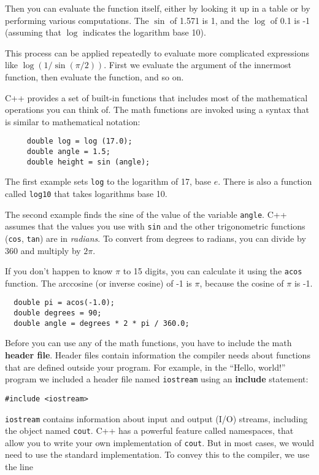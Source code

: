 Then you can evaluate the function itself, either by looking it up in
a table or by performing various computations.  The $\sin$ of 1.571 is
1, and the $\log$ of 0.1 is -1 (assuming that $\log$ indicates the
logarithm base 10).

This process can be applied repeatedly to evaluate more complicated
expressions like $\log(1/\sin(\pi/2))$.  First we evaluate the
argument of the innermost function, then evaluate the function,
and so on.

C++ provides a set of built-in functions that includes most
of the mathematical operations you can think of.
The math functions are invoked using a syntax that is similar to
mathematical notation:

\begin{lstlisting}
     double log = log (17.0);
     double angle = 1.5;
     double height = sin (angle);
\end{lstlisting}
%
The first example sets {\tt log} to the logarithm of 17, base
$e$.  There is also a function called {\tt log10} that takes
logarithms base 10.

The second example finds the sine of the value of the variable
{\tt angle}.  C++ assumes that the
values you use with {\tt sin} and the other trigonometric functions
({\tt cos}, {\tt tan}) are in {\em radians}.  To
convert from degrees to radians, you can divide by 360
and multiply by $2 \pi$.  

If you don't happen to know $\pi$ to 15 digits, you can
calculate it using the {\tt acos} function.  The arccosine
(or inverse cosine) of -1 is $\pi$, because the cosine of
$\pi$ is -1.

\begin{lstlisting}
  double pi = acos(-1.0);
  double degrees = 90;
  double angle = degrees * 2 * pi / 360.0;
\end{lstlisting}
%
Before you can use any of the math functions, you have to
include the math {\bf header file}.  Header files contain
information the compiler needs about functions that are defined
outside your program.  For example, in the ``Hello, world!''
program we included a header file named {\tt iostream} using
an {\bf include} statement:

\begin{lstlisting}
#include <iostream>
\end{lstlisting}
%
{\tt iostream} contains information about input and output
(I/O) streams, including the object named {\tt cout}.
C++ has a powerful feature called namespaces, that
allow you to write your own implementation of {\tt cout}.
But in most cases, we would need to use the standard implementation.
To convey this to the compiler, we use the line

